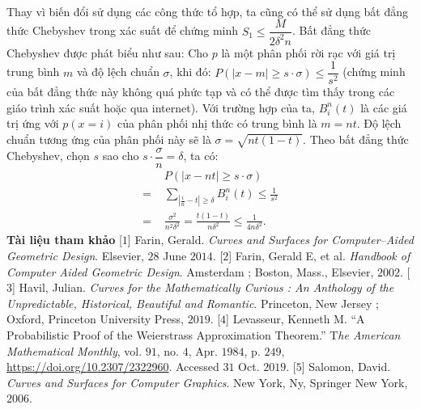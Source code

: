 \begin{multicols}{2}
\begin{align*}
	\end{align*}
	Thay vì biến đổi sử dụng các công thức tổ hợp, ta cũng có thể sử dụng bất đẳng thức Chebyshev trong xác suất để chứng minh $S_1 \le \dfrac{M}{2\delta^2n}$. Bất đẳng thức Chebyshev được phát biểu như sau: Cho $p$ là một phân phối rời rạc với giá trị trung bình $m$ và độ lệch chuẩn $\sigma$, khi đó: $P(|x-m| \ge s \cdot \sigma) \le \dfrac{1}{s^2}$ (chứng minh của bất đẳng thức này không quá phức tạp và có thể được tìm thấy trong các giáo trình xác suất hoặc qua internet). Với trường hợp của ta, $B_i^n (t)$ là các giá trị ứng với $p(x=i)$ của phân phối nhị thức có trung bình là $m=nt$. Độ lệch chuẩn tương ứng của phân phối này sẽ là $\sigma = \sqrt{nt(1-t)}$. Theo bất đẳng thức Chebyshev, chọn $s$ sao cho $s \cdot \dfrac{\sigma}{n} = \delta$, ta có:
	\begin{align*}
		&P\left(|x- nt| \ge s \cdot \sigma\right)\\
		= \,\,&\sum\limits_{\left| {\frac{i}{n} - t} \right| \ge \delta } {B_i^n(t)}  \le \frac{1}{{{s^2}}} \\
		= \,\,&\frac{{{\sigma ^2}}}{{{n^2}{\delta ^2}}} = \frac{{t(1 - t)}}{{n{\delta ^2}}} \le \frac{1}{{4n{\delta ^2}}}.
	\end{align*}
	\textbf{\color{toanhocdoisong}Tài liệu tham khảo}
	\vskip 0.1cm
	[$1$] Farin, Gerald. \textit{Curves and Surfaces for Computer--Aided Geometric Design}. Elsevier, $28$ June $2014$.
	\vskip 0.1cm
	[$2$] Farin, Gerald E, et al. \textit{Handbook of Computer Aided Geometric Design}. Amsterdam ; Boston, Mass., Elsevier, $2002$.
	\vskip 0.1cm
	[$3$] Havil, Julian. \textit{Curves for the Mathematically Curious : An Anthology of the Unpredictable, Historical, Beautiful and Romantic}. Princeton, New Jersey ; Oxford, Princeton University Press, $2019$.
	\vskip 0.1cm
	[$4$] Levasseur, Kenneth M. ``A Probabilistic Proof of the Weierstrass Approximation Theorem.'' T\textit{he American Mathematical Monthly}, vol. $91$, no. $4$, Apr. $1984$, p. $249$, \url{https://doi.org/10.2307/2322960}. Accessed $31$ Oct. $2019$.
	\vskip 0.1cm
	[$5$] Salomon, David. \textit{Curves and Surfaces for Computer Graphics}. New York, Ny, Springer New York, $2006$.
\end{multicols}